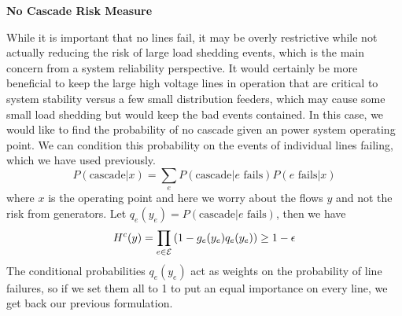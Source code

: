 \textbf{No Cascade Risk Measure}

While it is important that no lines fail, it may be overly restrictive while not actually reducing the risk of large load shedding events, which is the main concern from a system reliability perspective. It would certainly be more beneficial to keep the large high voltage lines in operation that are critical to system stability versus a few small distribution feeders, which may cause some small load shedding but would keep the bad events contained.  In this case, we would like to find the probability of no cascade given an power system operating point.  We can condition this probability on the events of individual lines failing, which we have used previously.
\begin{equation*}
P(\mbox{cascade}|x) = \sum_e P(\mbox{cascade}|e\mbox{ fails}) P(e\mbox{ fails}|x)
\end{equation*}
where $x$ is the operating point and here we worry about the flows $y$ and not the risk from generators.  Let $q_e(y_e) = P(\mbox{cascade}|e\mbox{ fails})$, then we have
\begin{equation} 
H^c(y) = \prod_{e \in \mathcal{E}} \left( 1 - g_e(y_e)q_e(y_e) \right) \geq 1 - \epsilon
  \end{equation}  
The conditional probabilities $q_e(y_e)$ act as weights on the probability of line failures, so if we set them all to 1 to put an equal importance on every line, we get back our previous formulation.
